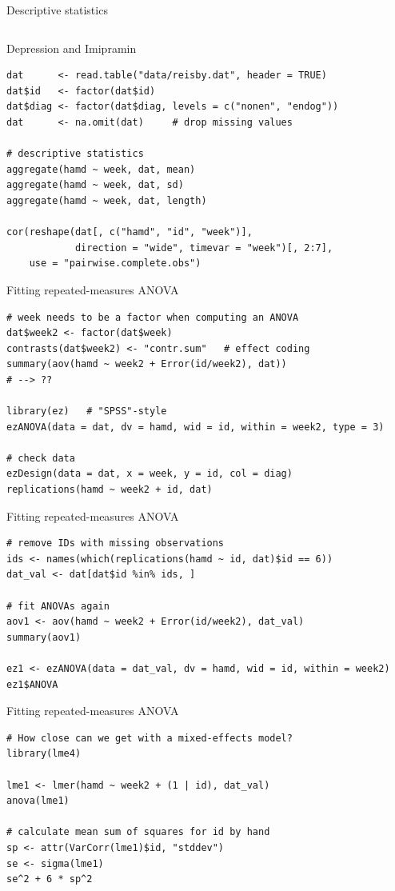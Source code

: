\documentclass[aspectratio=169]{beamer}
\begin{document}
\begin{frame}{Descriptive statistics}
\begin{columns}
\begin{column}{.6\textwidth}
  \vspace{1cm}
\end{column}
\end{columns}
\end{frame}

\begin{frame}[fragile]{Depression and Imipramin}
  \begin{lstlisting}
dat      <- read.table("data/reisby.dat", header = TRUE)
dat$id   <- factor(dat$id)
dat$diag <- factor(dat$diag, levels = c("nonen", "endog"))
dat      <- na.omit(dat)     # drop missing values

# descriptive statistics
aggregate(hamd ~ week, dat, mean)
aggregate(hamd ~ week, dat, sd)
aggregate(hamd ~ week, dat, length)

cor(reshape(dat[, c("hamd", "id", "week")], 
            direction = "wide", timevar = "week")[, 2:7],
    use = "pairwise.complete.obs")
  \end{lstlisting}
\end{frame}

\begin{frame}[fragile]{Fitting repeated-measures ANOVA}
  \begin{lstlisting}
# week needs to be a factor when computing an ANOVA
dat$week2 <- factor(dat$week)
contrasts(dat$week2) <- "contr.sum"   # effect coding
summary(aov(hamd ~ week2 + Error(id/week2), dat))
# --> ??

library(ez)   # "SPSS"-style
ezANOVA(data = dat, dv = hamd, wid = id, within = week2, type = 3)

# check data
ezDesign(data = dat, x = week, y = id, col = diag)
replications(hamd ~ week2 + id, dat)
  \end{lstlisting}
\end{frame}

\begin{frame}[fragile]{Fitting repeated-measures ANOVA}
  \begin{lstlisting}
# remove IDs with missing observations
ids <- names(which(replications(hamd ~ id, dat)$id == 6))
dat_val <- dat[dat$id %in% ids, ]

# fit ANOVAs again
aov1 <- aov(hamd ~ week2 + Error(id/week2), dat_val)
summary(aov1)

ez1 <- ezANOVA(data = dat_val, dv = hamd, wid = id, within = week2)
ez1$ANOVA
  \end{lstlisting}
\end{frame}

\begin{frame}[fragile]{Fitting repeated-measures ANOVA}
  \begin{lstlisting}
# How close can we get with a mixed-effects model?
library(lme4)

lme1 <- lmer(hamd ~ week2 + (1 | id), dat_val)
anova(lme1)

# calculate mean sum of squares for id by hand
sp <- attr(VarCorr(lme1)$id, "stddev")
se <- sigma(lme1)
se^2 + 6 * sp^2
  \end{lstlisting}
\end{frame}
\end{document}
